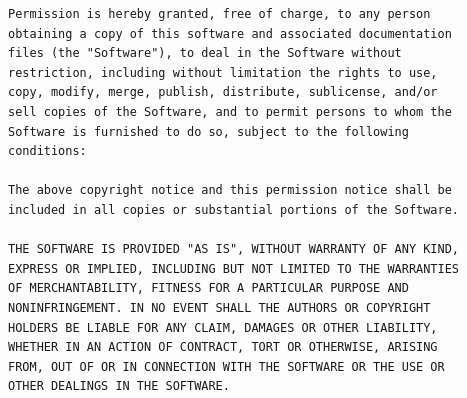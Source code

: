 \begin{verbatim}
Permission is hereby granted, free of charge, to any person
obtaining a copy of this software and associated documentation
files (the "Software"), to deal in the Software without
restriction, including without limitation the rights to use,
copy, modify, merge, publish, distribute, sublicense, and/or
sell copies of the Software, and to permit persons to whom the
Software is furnished to do so, subject to the following
conditions:

The above copyright notice and this permission notice shall be
included in all copies or substantial portions of the Software.

THE SOFTWARE IS PROVIDED "AS IS", WITHOUT WARRANTY OF ANY KIND,
EXPRESS OR IMPLIED, INCLUDING BUT NOT LIMITED TO THE WARRANTIES
OF MERCHANTABILITY, FITNESS FOR A PARTICULAR PURPOSE AND
NONINFRINGEMENT. IN NO EVENT SHALL THE AUTHORS OR COPYRIGHT
HOLDERS BE LIABLE FOR ANY CLAIM, DAMAGES OR OTHER LIABILITY,
WHETHER IN AN ACTION OF CONTRACT, TORT OR OTHERWISE, ARISING
FROM, OUT OF OR IN CONNECTION WITH THE SOFTWARE OR THE USE OR
OTHER DEALINGS IN THE SOFTWARE.
\end{verbatim}
